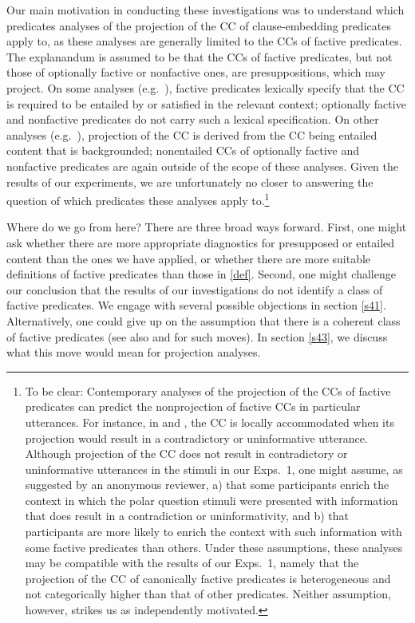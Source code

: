 \documentclass{language}
\newcommand{\6}{\mbox{$[\hspace*{-.6mm}[$}}
\newcommand{\9}{\mbox{$]\hspace*{-.6mm}]$}}
\begin{document}
Our main motivation in conducting these investigations was to understand which predicates analyses of the projection of the CC of clause-embedding predicates apply to, as these analyses are generally limited to the CCs of factive predicates. The explanandum is assumed to be that the CCs of factive predicates, but not those of optionally factive or nonfactive ones, are presuppositions, which may project. On some analyses (e.g.\ \citealt{heim83,vds92}), factive predicates lexically specify that the CC is required to be entailed by or satisfied in the relevant context; optionally factive and nonfactive predicates do not carry such a lexical specification. On other analyses (e.g.\ \citealt{abrusan2011,abrusan2016,romoli2015,best-question}), projection of the CC is derived from the CC being entailed content that is backgrounded; nonentailed CCs of optionally factive and nonfactive predicates are again outside of the scope of these analyses. Given the results of our experiments, we are unfortunately no closer to answering the question of which predicates these analyses apply to.\footnote{To be clear: Contemporary analyses of the projection of the CCs of factive predicates can predict the nonprojection of factive CCs in particular utterances. For instance, in \citealt{heim83} and \citealt{vds92}, the CC is locally accommodated when its projection would result in a contradictory or uninformative utterance. Although projection of the CC does not result in contradictory or uninformative utterances in the stimuli in our Exps.~1, one might assume, as suggested by an anonymous reviewer, a) that some participants enrich the context in which the polar question stimuli were presented with information that does result in a contradiction or uninformativity, and b) that participants are more likely to enrich the context with such information with some factive predicates than others. Under these assumptions, these analyses may be compatible with the results of our Exps.~1, namely that the projection of the CC of canonically factive predicates is heterogeneous and not categorically higher than that of other predicates. Neither assumption, however, strikes us as independently motivated.} 

Where do we go from here? There are three broad ways forward. First, one might ask whether there are more appropriate diagnostics for presupposed or entailed content than the ones we have applied, or whether there are more suitable definitions of factive predicates than those in \ref{def}. Second, one might challenge our conclusion that the results of our investigations do not identify a class of factive predicates. We engage with several possible objections in  section \ref{s41}. Alternatively, one could give up on the assumption that there is a coherent class of factive predicates (see also \citealt{karttunen2016} and \citealt{djaerv-thesis} for such moves). In section \ref{s43}, we discuss what this move would mean for projection analyses.
\end{document}
